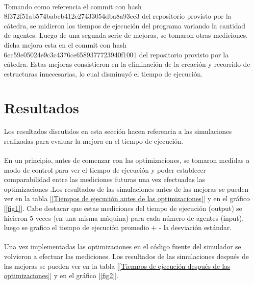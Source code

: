 \documentclass{article}
\begin{document}
\paragraph{}
Tomando como referencia el commit con hash 8f372f51ab574babcb412e27433054dba8a93cc3 del repositorio provisto por la cátedra, se midieron los tiempos de ejecución del programa variando la cantidad de agentes. Luego de una segunda serie de mejoras, se tomaron otras mediciones, dicha mejora esta en el commit con hash 6cc59e05024e9c3c4376ce6589377723940f1001 del repositorio provisto por la cátedra. Estas mejoras consistieron en la eliminación de la creación y recorrido de estructuras innecesarias, lo cual disminuyó el tiempo de ejecución.

\section{Resultados}

\paragraph{}
Los resultados discutidos en esta sección hacen referencia a las simulaciones realizadas para evaluar la mejora en el tiempo de ejecución.

\paragraph{}
En un principio, antes de comenzar con las optimizaciones, se tomaron medidas a modo de control para ver el tiempo de ejecución y poder establecer comparabilidad entre las mediciones futuras una vez efectuadas las optimizaciones .Los resultados de las simulaciones antes de las mejoras se pueden ver en la tabla [\ref{Tiempos de ejecución antes de las optimizaciones}] y en el gráfico [\ref{fig1}]. Cabe destacar que estas mediciones del tiempo de ejecución (output) se hicieron 5 veces (en una misma máquina)  para cada número de agentes (input), luego se grafico el tiempo de ejecución promedio + - la desviación estándar.

\paragraph{}
Una vez implementadas las optimizaciones en el código fuente del simulador se volvieron a efectuar las mediciones. Los resultados de las simulaciones después de las mejoras se pueden ver en la tabla [\ref{Tiempos de ejecución después de las optimizaciones}] y en el gráfico [\ref{fig2}].
\end{document}
